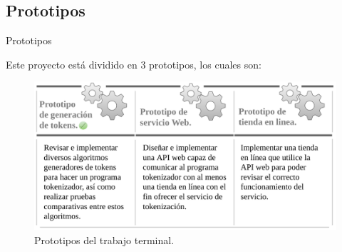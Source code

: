\subsection{Prototipos} %
\begin{frame}{Prototipos}

  Este proyecto está dividido en 3 prototipos, los cuales son:

  \begin{figure}[H]
    \begin{center}
      \includegraphics[width=1.0\linewidth]{diagramas/prototipos.png}
      \caption{Prototipos del trabajo terminal.}
    \end{center}
  \end{figure}

\end{frame}

%
%
%
%
